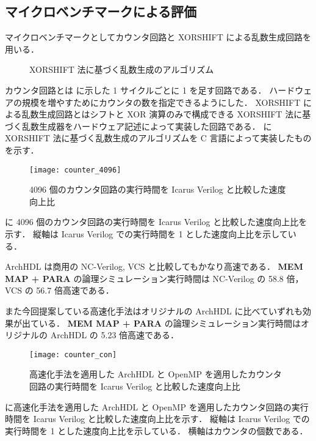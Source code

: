 \subsection{マイクロベンチマークによる評価}

マイクロベンチマークとしてカウンタ回路と XORSHIFT による乱数生成回路を用いる．

\begin{figure}[t]
 
 \caption{XORSHIFT 法に基づく乱数生成のアルゴリズム}
 \label{src:xorshift_alg}
\end{figure}

カウンタ回路とは  に示した 1 サイクルごとに 1 を足す回路である．
ハードウェアの規模を増やすためにカウンタの数を指定できるようにした．
XORSHIFT による乱数生成回路とはシフトと XOR 演算のみで構成できる XORSHIFT 法に基づく乱数生成器をハードウェア記述によって実装した回路である．
 に XORSHIFT 法に基づく乱数生成のアルゴリズムを C 言語によって実装したものを示す．

\begin{figure}[t]
 \centering
 \texttt{[image: counter\_4096]}
 \caption{4096 個のカウンタ回路の実行時間を Icarus Verilog と比較した速度向上比}
 \label{fig:counter4096}
\end{figure}

 に 4096 個のカウンタ回路の実行時間を Icarus Verilog と比較した速度向上比を示す．
縦軸は Icarus Verilog での実行時間を 1 とした速度向上比を示している．

ArchHDL は商用の NC-Verilog, VCS と比較してもかなり高速である．
\textbf{MEM MAP + PARA} の論理シミュレーション実行時間は NC-Verilog の 58.8 倍，VCS の 56.7 倍高速である．

また今回提案している高速化手法はオリジナルの ArchHDL に比べていずれも効果が出ている．
\textbf{MEM MAP + PARA} の論理シミュレーション実行時間はオリジナルの ArchHDL の 5.23 倍高速である．



\begin{figure}[t]
 \centering
 \texttt{[image: counter\_con]}
 \caption{高速化手法を適用した ArchHDL と OpenMP を適用したカウンタ回路の実行時間を Icarus Verilog と比較した速度向上比}
 \label{fig:counter_con}
\end{figure}

 に高速化手法を適用した ArchHDL と OpenMP を適用したカウンタ回路の実行時間を Icarus Verilog と比較した速度向上比を示す．
縦軸は Icarus Verilog での実行時間を 1 とした速度向上比を示している．
横軸はカウンタの個数である．

